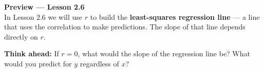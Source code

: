 \documentclass[10pt]{article}
\begin{document}
\begin{tcolorbox}[colback=greenbg, colframe=greenacc, boxrule=0.8pt, arc=2mm,
    left=4mm, right=4mm, top=3mm, bottom=3mm]
\small\textbf{Preview --- Lesson 2.6}\\[4pt]
In Lesson 2.6 we will use $r$ to build the \textbf{least-squares regression line} --- a line
that uses the correlation to make predictions. The slope of that line depends directly on $r$.

\vspace{4pt}
\textbf{Think ahead:} If $r = 0$, what would the slope of the regression line be? What
would you predict for $y$ regardless of $x$?\\[6pt]
\\[2pt]
\ansline{}
\end{tcolorbox}
\end{document}
